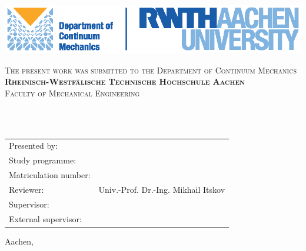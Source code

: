 \begin{titlepage}
	
	\begin{center}
		
		\vspace*{-2cm}
		\begin{minipage}[b]{0.45\textwidth}
		\end{minipage}
		\hfill
		\begin{minipage}[b]{0.45\textwidth}
		\begin{flushright}
					\includegraphics[height=6em]{Style/rwth_km_logo_en.eps}
		\end{flushright}
		\end{minipage}
		
		\normalsize{\scshape{
				The present work was submitted to the Department of Continuum Mechanics}
		}\\[1em]
		\vspace{1cm}
		\normalsize{\scshape\textbf{Rheinisch-Westfälische Technische Hochschule Aachen}}\\
		\normalsize{\normalfont\scshape{Faculty of Mechanical Engineering}}
		
		
		\vspace{2cm}
		
		\Large{\scshape\textbf{\thesistype}}\\[4ex]
		\huge{\scshape\textbf{\titel}}\\[1.5ex]
		
		\vfill{}
		
		\normalsize
		\begin{tabular}{p{5cm}p{8cm}}
			Presented by: 			& \quad  \autor\\[1.2ex]
			Study programme:		& \quad  \\[1.2ex]
			Matriculation number: 	& \quad \matnumber\\[1.2ex]
			Reviewer: 				& \quad Univ.-Prof. Dr.-Ing. Mikhail Itskov\\[1.2ex]
			Supervisor:				& \quad \supervisorinternal \\[1.2ex]
			External supervisor:	& \quad \supervisorexternal \\[1.2ex]
		\end{tabular}
		
		\vspace{3cm}
		
		Aachen, \submitdate
		
		\vspace*{-3.3cm}
		
	\end{center}
	
\end{titlepage}
\newpage
